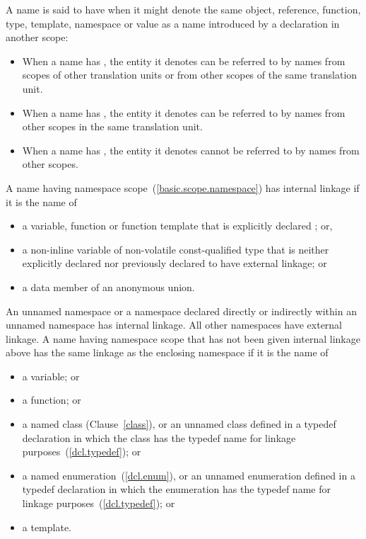 \pnum
{}%
%
%
%
A name is said to have  when it might denote the same
object, reference, function, type, template, namespace or value as a
name introduced by a declaration in another scope:
\begin{itemize}
\item When a name has ,
the entity it denotes
can be referred to by names from scopes of other translation units or
from other scopes of the same translation unit.

\item When a name has ,
the entity it denotes
can be referred to by names from other scopes in the same translation
unit.

\item When a name has , the entity it denotes
cannot be referred to by names from other scopes.
\end{itemize}

\pnum
{}%
%
%
%
%
%
A name having namespace scope~(\ref{basic.scope.namespace}) has internal
linkage if it is the name of
\begin{itemize}
\item
  a variable, function or function template that is
  explicitly declared ; or,
\item
  a non-inline variable of non-volatile const-qualified type that is
  neither explicitly declared  nor previously
  declared to have external linkage; or
\item
  a data member of an anonymous union.
\end{itemize}

\pnum
An unnamed namespace or a namespace declared directly or indirectly within an
unnamed namespace has internal linkage. All other namespaces have external linkage.
A name having namespace scope
that has not been given internal linkage above
has the same linkage as the enclosing namespace if it is the name of
\begin{itemize}
\item a variable; or
\item a function; or
\item {}%
a named class (Clause~\ref{class}), or an unnamed class defined in a
typedef declaration in which the class has the typedef name for linkage
purposes~(\ref{dcl.typedef}); or
\item {}%
a named enumeration~(\ref{dcl.enum}), or an unnamed enumeration defined
in a typedef declaration in which the enumeration has the typedef name
for linkage purposes~(\ref{dcl.typedef}); or
\item a template.
\end{itemize}

